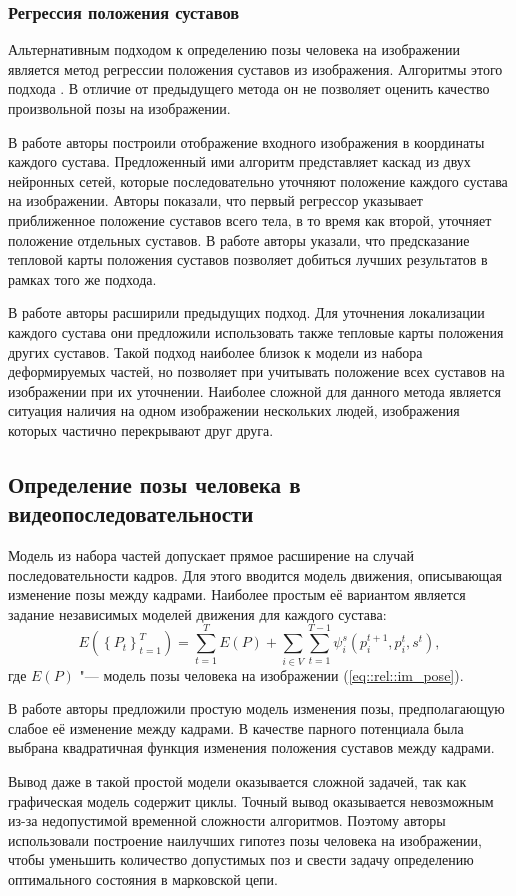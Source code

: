\subsubsection{Регрессия положения суставов}

Альтернативным подходом к определению позы человека на изображении является метод регрессии положения суставов из изображения. Алгоритмы этого подхода . В отличие от предыдущего метода он не позволяет оценить качество произвольной позы на изображении.

В работе \cite{toshev2014deeppose} авторы построили отображение входного изображения в координаты каждого сустава. Предложенный ими алгоритм представляет каскад из двух нейронных сетей, которые последовательно уточняют положение каждого сустава на изображении. Авторы показали, что первый регрессор указывает приближенное положение суставов всего тела, в то время как второй, уточняет положение отдельных суставов. В работе \cite{tompson2015efficient} авторы указали, что предсказание тепловой карты положения суставов позволяет добиться лучших результатов в рамках того же подхода.

В работе \cite{bulat2016human} авторы расширили предыдущих подход. Для уточнения локализации каждого сустава они предложили использовать также тепловые карты положения других суставов. Такой подход наиболее близок к модели из набора деформируемых частей, но позволяет при учитывать положение всех суставов на изображении при их уточнении. Наиболее сложной для данного метода является ситуация наличия на одном изображении нескольких людей, изображения которых частично перекрывают друг друга.
 
\subsection{Определение позы человека в видеопоследовательности}

Модель из набора частей допускает прямое расширение на случай последовательности кадров. Для этого вводится модель движения, описывающая изменение позы между кадрами. Наиболее простым её вариантом является задание независимых моделей движения для каждого сустава:
\begin{equation}
	E(\left\{P_t\right\}_{t=1}^T) = \sum_{t=1}^T E(P) + \sum_{i\in V}\sum_{t=1}^{T-1}\psi_i^s(p_i^{t+1}, p_i^t, s^t),
\end{equation}
где $E(P)$ "--- модель позы человека на изображении (\ref{eq::rel::im_pose}).

В работе \cite{park2011n} авторы предложили простую модель изменения позы, предполагающую слабое её изменение между кадрами. В качестве парного потенциала была выбрана квадратичная функция изменения положения суставов между кадрами.

Вывод даже в такой простой модели оказывается сложной задачей, так как графическая модель содержит циклы. Точный вывод оказывается невозможным из-за недопустимой временной сложности алгоритмов. Поэтому авторы \cite{park2011n} использовали построение наилучших гипотез позы человека на изображении, чтобы уменьшить количество допустимых поз и свести задачу определению оптимального состояния в марковской цепи.